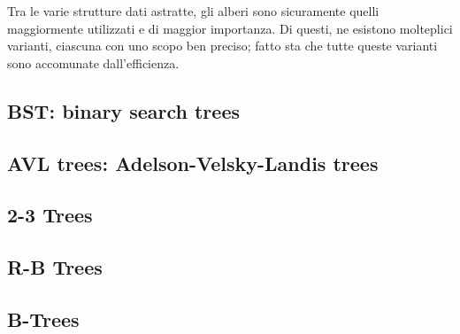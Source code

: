 \documentclass{subfiles}
\begin{document}
Tra le varie strutture dati astratte, gli alberi sono sicuramente quelli maggiormente utilizzati e di maggior importanza.
Di questi, ne esistono molteplici varianti, ciascuna con uno scopo ben preciso; fatto sta che tutte queste varianti sono accomunate dall'efficienza.

\subsection{BST: binary search trees}


\subsection{AVL trees: Adelson-Velsky-Landis trees}

\clearpage %

\subsection{2-3 Trees}


\subsection{R-B Trees}


\subsection{B-Trees}

\clearpage
\end{document}
